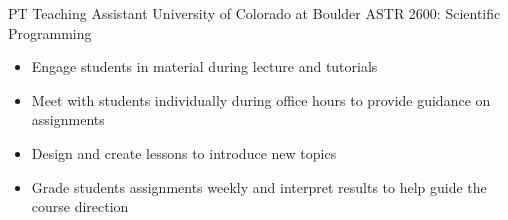     {PT} %
    {Teaching Assistant} %
    {University of Colorado at Boulder} %
    {ASTR 2600: Scientific Programming}
    {\begin{itemize}
    \setlength\itemsep{0.1em} 
        \item Engage students in material during lecture and tutorials
        \item Meet with students individually during office hours to provide
            guidance on assignments
        \item Design and create lessons to introduce new topics
        \item Grade students assignments weekly and interpret results to help
            guide the course direction
    \end{itemize}
}
